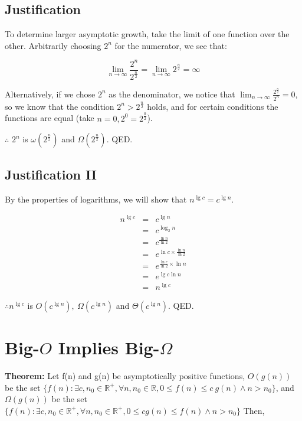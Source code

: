 \documentclass{article}
\begin{document}
\subsection{Justification}
To determine larger asymptotic growth, take the limit of one function over the other. Arbitrarily choosing $2^n$ for the numerator, we see that:

\begin{equation}
\lim _{n \rightarrow \infty} \frac{2^n}{2^{\frac{n}{2}}} = \lim _{n \rightarrow \infty} 2^{\frac{n}{2}} = \infty
\end{equation}

Alternatively, if we chose $2^n$ as the denominator, we notice that $\lim _{n \rightarrow \infty} \frac{2^{\frac{n}{2}}}{2^n} = 0$, so we know that the condition $2^n > 2^{\frac{n}{2}}$ holds, and for certain conditions the functions are equal (take $n = 0, 2^{0} = 2^{\frac{0}{2}}$).

$\therefore$ $2^n$ is $\omega(2^\frac{n}{2})$ and $\Omega(2^\frac{n}{2})$. QED.

\subsection{Justification II}
By the properties of logarithms, we will show that $n^{\lg c} = c^{\lg n}$.

\begin{eqnarray}
n^{\lg c} & = & c^{\lg n} \\
& = & c^{\log _2 n} \\
& = & c^\frac{\ln n}{\ln 2} \\
& = & e^{\ln c \times \frac{\ln n}{\ln 2}} \\
& = & e^{\frac{\ln c}{\ln 2} \times \ln n} \\
& = & e^{\lg c \ln n} \\
& = & n^{\lg c}
\end{eqnarray}

$\therefore n^{\lg c}$ is $O(c^{\lg n}), \ \Omega(c^{\lg n})$ and $\Theta(c^{\lg n})$. QED.

\section{Big-$O$ Implies Big-$\Omega$}
\textbf{Theorem: } Let f(n) and g(n) be asymptotically positive functions, $O(g(n))$ be the set $\{ f(n) : \exists c, n_0 \in \mathbb{R}^+, \forall n, n_0 \in \mathbb{R}, 0 \leq f(n) \leq c \ g(n) \wedge n > n_0  \}$, and $\Omega(g(n))$ be the set $\{ f(n) : \exists c, n_0 \in \mathbb{R}^+, \forall n, n_0 \in \mathbb{R}^+, 0 \leq cg(n) \leq f(n) \wedge n > n_0 \}$ Then,
\end{document}
